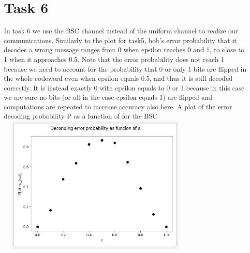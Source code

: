 \documentclass{report}
\begin{document}
\section*{Task 6}
 
 In task 6 we use the BSC channel instead of the uniform channel to realize our communications.
Similarly to the plot for task5, bob's error probability that it decodes a wrong message ranges from 0 when epsilon reaches 0 and 1, to close to 1 when it approaches 0.5.
Note that the error probability does not reach 1 because we need to account for the probability that 0 or only 1 bits are flipped in the whole codeword even when epsilon equals 0.5, and thus it is still decoded correctly.
It is instead exactly 0 with epsilon equals to 0 or 1 because in this case we are sure no bits (or all in the case epsilon equals 1) are flipped and computations are repeated to increase accuracy also here.
\hfill \break \linebreak
A plot of the error decoding probability P as a function of \textepsilon \space for the BSC
\includegraphics[width=10cm,height=7cm]{10}
\end{document}
